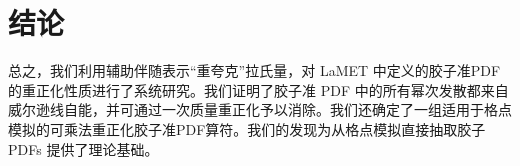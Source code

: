 \section{结论}\label{sec:conclusion}

总之，我们利用辅助伴随表示“重夸克”拉氏量，对 LaMET 中定义的胶子准PDF的重正化性质进行了系统研究。我们证明了胶子准 PDF 中的所有幂次发散都来自威尔逊线自能，并可通过一次质量重正化予以消除。我们还确定了一组适用于格点模拟的可乘法重正化胶子准PDF算符。我们的发现为从格点模拟直接抽取胶子 PDFs 提供了理论基础。
